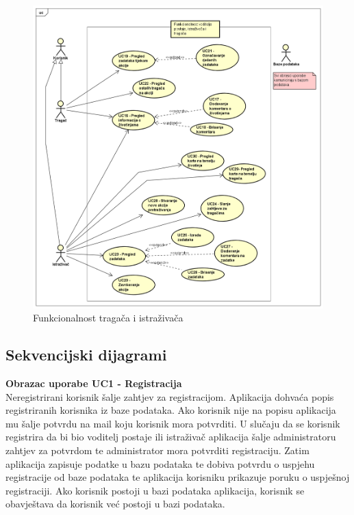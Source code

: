					\begin{figure}[H]
						\includegraphics[scale=0.5]{slike/dijagram ekipa.png} %
						\centering
						\caption{Funkcionalnost tragača i istraživača}
						\label{fig:Funkcionalnost tragača i istraživača}
					\end{figure}
				
					\eject		
				
			\subsection{Sekvencijski dijagrami}
				
				\noindent 
				\textbf{Obrazac uporabe UC1 - Registracija}\\

				\noindent 
				Neregistrirani korisnik šalje zahtjev za registracijom. Aplikacija dohvaća popis registriranih korisnika
        				iz baze podataka.
        				Ako korisnik nije na popisu aplikacija mu šalje potvrdu na mail koju korisnik mora potvrditi.
        				U slučaju da se korisnik registrira da bi bio voditelj postaje ili istraživač aplikacija šalje administratoru
        				zahtjev za potvrdom te administrator mora potvrditi registraciju.
        				Zatim aplikacija zapisuje podatke u bazu podataka te dobiva potvrdu o uspjehu registracije od baze podataka
        				te aplikacija korisniku prikazuje poruku o uspješnoj registraciji.
        				Ako korisnik postoji u bazi podataka aplikacija, korisnik se obavještava da korisnik već postoji u bazi podataka.

